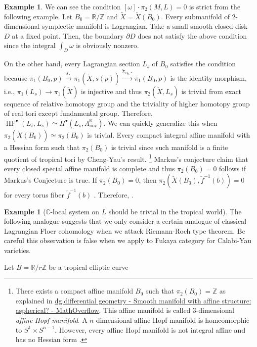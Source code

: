 \documentclass[a4paper,dvipdfmx,reqno,12pt]{amsart}
\makeatletter
\newcommand{\ind}[2]{\emph{#1}\index{1{#2}@{#1}}}
\theoremstyle{definition}
\newtheorem{Eg}[Thm]{Example}
\newcommand{\C}{\mathbb{C}}%
\newcommand{\R}{\mathbb{R}}%
\newcommand{\Z}{\mathbb{Z}}%
\newcommand{\opn}[1]{\operatorname{#1}}
\newcommand{\xto}[1]{\xrightarrow{#1}}
\numberwithin{equation}{section}
\makeatother
\begin{document}
\begin{Eg}
  We can see the condition $[\omega]\cdot\pi_2(M,L)=0$ is strict from the following example.
  Let $B_0=\R/\Z$ and
  $\check{X}=\check{X}(B_0)$. Every submanifold of 2-dimensional symplectic manifold is Lagrangian. Take a small smooth closed disk $D$ at a fixed point. Then, the boundary $\partial D$ does not satisfy the above condition since the integral $\int_{D}\omega$ is obviously nonzero.

  On the other hand, every Lagrangian section $L_s$ of $B_0$ satisfies the condition because $\pi_{1}(B_0,p)\xto{s_*} \pi_{1}(\check{X},s(p))\xto{\check{\pi}_{B_0,*}}\pi_{1}(B_0,p)$ is the identity morphism, i.e., $\pi_1(L_s)\to \pi_1(\check{X})$ is injective and thus $\pi_2(\check{X},L_s)$ is trivial from exact sequence of relative homotopy group and the triviality of higher homotopy group of real tori except fundamental group.
  Therefore, $\opn{HF}^{\bullet}(L_s,L_s)\simeq H^{\bullet}(L_s,\Lambda_{\opn{nov}}^{\mathbb{K}})$. We can quickly generalize this when $\pi_2(\check{X}(B_0))\simeq \pi_2(B_0)$ is trivial.
  Every compact integral affine manifold with a Hessian form such that $\pi_2(B_0)$ is trivial since such manifold is a finite quotient of tropical tori by Cheng-Yau's result.
  \footnote{There exists a compact affine manifold $B_0$ such that $\pi_2(B_0)=\Z$ as explained in \href{https://mathoverflow.net/questions/271499/smooth-manifold-with-affine-structure-aspherical}{dg.differential geometry - Smooth manifold with affine structure: aspherical? - MathOverflow}. This affine manifold is called 3-dimensional \ind{affine Hopf manifold}{affine Hopf manifold}. A $n$-dimensional affine Hopf manifold is homeomorphic to $S^{1}\times S^{n-1}$. However, every affine Hopf manifold is not integral affine and has no Hessian form \cite[Corollary 7.3.5]{MR2293045}.}
  Markus's conjecture claim that every closed special affine manifold is complete and thus
  $\pi_2(B_0)=0$ follows if Markus's Conjecture is true.
  If $\pi_2(B_0)=0$, then $\pi_2(\check{X}(B_0),\check{f}^{-1}(b))=0$ for every torus fiber $\check{f}^{-1}(b)$  \cite[Theorem 4.41, Proposition 4.48]{hatcherAlgebraicTopology2002a}.
  Therefore,  \cite{MR4301560}.
\end{Eg}






\begin{Eg}[{$\C$-local system on $L$ should be trivial in the tropical world}]
  The following analogue suggests that we only consider a certain analogue of classical Lagrangian Floer cohomology when we attack Riemann-Roch type theorem. Be careful this observation is false when we apply to Fukaya category for Calabi-Yau varieties.

  Let $B=\R/r\Z$ be a tropical elliptic curve

\end{Eg}
\end{document}
